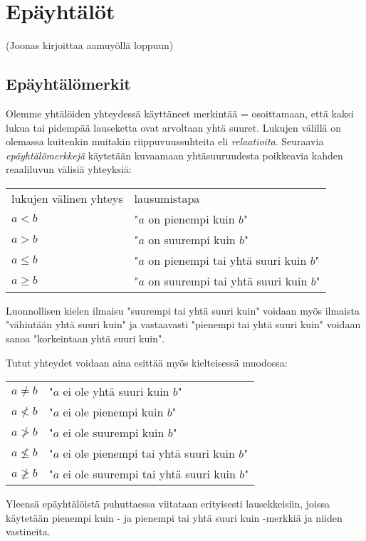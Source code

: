 \chapter{Epäyhtälöt}
(Joonas kirjoittaa aamuyöllä loppuun)

\section{Epäyhtälömerkit}

Olemme yhtälöiden yhteydessä käyttäneet merkintää = osoittamaan, että kaksi lukua tai pidempää lauseketta ovat arvoltaan yhtä suuret. Lukujen välillä on olemassa kuitenkin muitakin riippuvuussuhteita eli \emph{relaatioita}. Seuraavia \emph{epäyhtälömerkkejä} käytetään kuvaamaan yhtäsuuruudesta poikkeavia kahden reaaliluvun välisiä yhteyksiä:


\begin{tabular}{ll}
lukujen välinen yhteys & lausumistapa \\
$a<b$ &  "$a$ on pienempi kuin $b$"\\
$a>b$ & "$a$ on suurempi kuin $b$"\\
$a \leq b$ & "$a$ on pienempi tai yhtä suuri kuin $b$" \\
$a \geq b$ & "$a$ on suurempi tai yhtä suuri kuin $b$" \\
\end{tabular}

Luonnollisen kielen ilmaisu "suurempi tai yhtä suuri kuin" voidaan myös ilmaista
"vähintään yhtä suuri kuin" ja vastaavasti "pienempi tai yhtä suuri kuin"
voidaan sanoa "korkeintaan yhtä suuri kuin".

Tutut yhteydet voidaan aina esittää myös kielteisessä muodossa:

\begin{tabular}{ll}
$a\neq b$ & "$a$ ei ole yhtä suuri kuin $b$" \\
$a \nless b$ &  "$a$ ei ole pienempi kuin $b$"\\
$a \ngtr b$ & "$a$ ei ole suurempi kuin $b$"\\
$a \nleq b$ & "$a$ ei ole pienempi tai yhtä suuri kuin $b$" \\
$a \ngeq b$ & "$a$ ei ole suurempi tai yhtä suuri kuin $b$" \\
\end{tabular}

Yleensä epäyhtälöistä puhuttaessa viitataan erityisesti lausekkeisiin, joissa käytetään pienempi kuin - ja pienempi tai yhtä suuri kuin -merkkiä ja niiden vastineita.

